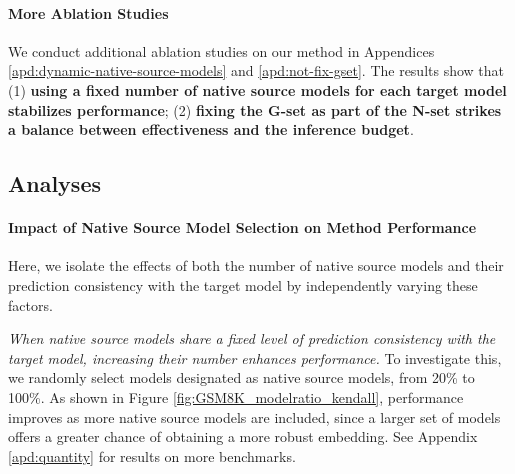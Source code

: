 \paragraph{More Ablation Studies} 
We conduct additional ablation studies on our method in Appendices \ref{apd:dynamic-native-source-models} and \ref{apd:not-fix-gset}. The results show that (1) \textbf{using a fixed number of native source models for each target model stabilizes performance}; (2) \textbf{fixing the G-set as part of the N-set strikes a balance between effectiveness and the inference budget}.

\subsection{Analyses}
\paragraph{Impact of Native Source Model Selection on Method Performance} Here, we isolate the effects of both the number of native source models and their prediction consistency with the target model by independently varying these factors.

\textit{When native source models share a fixed level of prediction consistency with the target model, increasing their number enhances performance.} To investigate this, we randomly select models designated as native source models, from 20\% to 100\%. As shown in Figure \ref{fig:GSM8K_modelratio_kendall}, performance improves as more native source models are included, since a larger set of models offers a greater chance of obtaining a more robust embedding. See Appendix \ref{apd:quantity} for results on more benchmarks.

